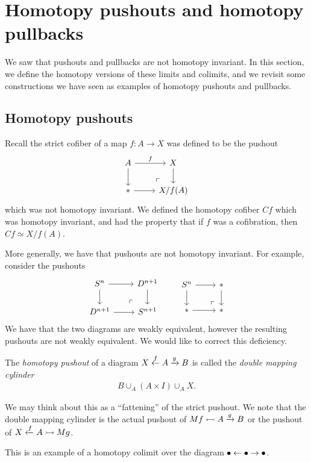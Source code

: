 \documentclass{article}[11pt]
\begin{document}
\section{Homotopy pushouts and homotopy pullbacks}
We saw that pushouts and pullbacks are not homotopy invariant. In this section, we define the homotopy versions of these limits and colimits, and we revisit some constructions we have seen as examples of homotopy pushouts and pullbacks. 
\subsection{Homotopy pushouts}
Recall the strict cofiber of a map $f\colon A \to X$ was defined to be the pushout
\[
	\begin{tikzcd}
	A\rar["f" above]\dar & X\dar \\
	\ast\rar & X/f(A)\po
	\end{tikzcd}
\]
which was not homotopy invariant. We defined the homotopy cofiber $Cf$ which was homotopy invariant, and had the property that if $f$ was a cofibration, then $Cf \simeq X/f(A)$.

More generally, we have that pushouts are not homotopy invariant. For example, consider the pushouts
\[
	\begin{tikzcd}
	S^n\rar\dar & D^{n+1}\dar \\
	D^{n+1}\rar & S^{n+1}\po
	\end{tikzcd} \quad \quad \begin{tikzcd}
	S^n\rar\dar & \ast\dar \\
	\ast\rar & \ast\po
	\end{tikzcd}
\]
We have that the two diagrams are weakly equivalent, however the resulting pushouts are not weakly equivalent. We would like to correct this deficiency.

\begin{definition} The \textit{homotopy pushout} of a diagram $X\overset{f}{\leftarrow} A \xrightarrow{g} B$ is called the \textit{double mapping cylinder}
\begin{align*}
	B\cup_A (A\times I)\cup_A X.
\end{align*}
\end{definition}

We may think about this as a ``fattening'' of the strict pushout. We note that the double mapping cylinder is the actual pushout of $Mf \leftarrowtail A \xrightarrow{g} B$ or the pushout of $X\xleftarrow{f} A \rightarrowtail Mg$.

\begin{note} This is an example of a homotopy colimit over the diagram $\bullet \leftarrow \bullet \to \bullet$.
\end{note}
\end{document}
